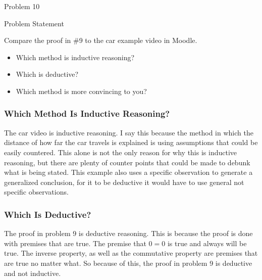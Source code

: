 \begin{problem}{Problem 10}
    \begin{statement}{Problem Statement}

        Compare the proof in \#9 to the car example video in Moodle.

        \begin{itemize}
            \item Which method is inductive reasoning?
            \item Which is deductive?
            \item Which method is more convincing to you?
        \end{itemize}

    \end{statement}

    \begin{highlight}[Solution]

        \subsubsection*{Which Method Is Inductive Reasoning?}

        The car video is inductive reasoning. I say this because the method in which the distance of how far the car travels is explained is using assumptions that could be easily
        countered. This alone is not the only reason for why this is inductive reasoning, but there are plenty of counter points that could be made to debunk what is being stated.
        This example also uses a specific observation to generate a generalized conclusion, for it to be deductive it would have to use general not specific observations.

        \vspace*{1em}

        \subsubsection*{Which Is Deductive?}

        The proof in problem 9 is deductive reasoning. This is because the proof is done with premises that are true. The premise that $0 = 0$ is true and always will be true. The 
        inverse property, as well as the commutative property are premises that are true no matter what. So because of this, the proof in problem 9 is deductive and not inductive.

        \vspace*{1em}


\end{highlight}
\end{problem}
